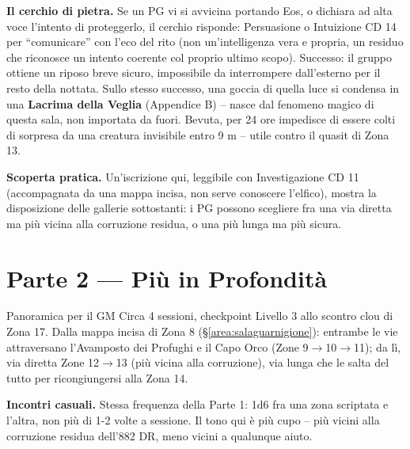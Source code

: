 \textbf{Il cerchio di pietra.} Se un PG vi si avvicina portando Eos, o dichiara ad alta voce l'intento di proteggerlo, il cerchio risponde: Persuasione o Intuizione CD 14 per ``comunicare'' con l'eco del rito (non un'intelligenza vera e propria, un residuo che riconosce un intento coerente col proprio ultimo scopo). Successo: il gruppo ottiene un riposo breve sicuro, impossibile da interrompere dall'esterno per il resto della nottata. Sullo stesso successo, una goccia di quella luce si condensa in una \textbf{Lacrima della Veglia} (Appendice B) -- nasce dal fenomeno magico di questa sala, non importata da fuori. Bevuta, per 24 ore impedisce di essere colti di sorpresa da una creatura invisibile entro 9 m -- utile contro il quasit di Zona 13.

\textbf{Scoperta pratica.} Un'iscrizione qui, leggibile con Investigazione CD 11 (accompagnata da una mappa incisa, non serve conoscere l'elfico), mostra la disposizione delle gallerie sottostanti: i PG possono scegliere fra una via diretta ma più vicina alla corruzione residua, o una più lunga ma più sicura.

\section{Parte 2 --- Più in Profondità}
\label{sec:parte2aelothir}

\begin{DndSidebar}[float=!b]{Panoramica per il GM}
  Circa 4 sessioni, checkpoint Livello 3 allo scontro clou di Zona 17. Dalla mappa incisa di Zona 8 (\S\ref{area:salaguarnigione}): entrambe le vie attraversano l'Avamposto dei Profughi e il Capo Orco (Zone 9$\to$10$\to$11); da lì, via diretta Zone 12$\to$13 (più vicina alla corruzione), via lunga che le salta del tutto per ricongiungersi alla Zona 14.
\end{DndSidebar}

\textbf{Incontri casuali.} Stessa frequenza della Parte 1: 1d6 fra una zona scriptata e l'altra, non più di 1-2 volte a sessione. Il tono qui è più cupo -- più vicini alla corruzione residua dell'882 DR, meno vicini a qualunque aiuto.

